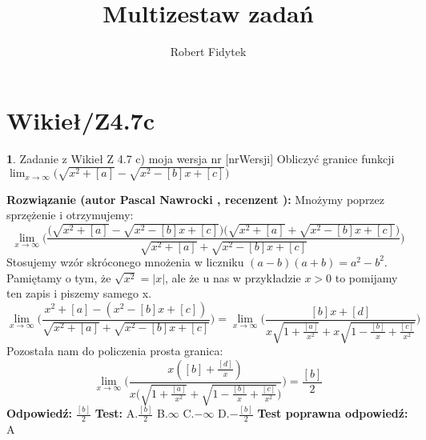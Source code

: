 \documentclass[12pt, a4paper]{article}
\title{Multizestaw zadań}
\author{Robert Fidytek}
\date{}
\theoremstyle{definition} %
\newtheorem{zad}{}
\newcommand{\kategoria}[1]{\section{#1}} %
\newcommand{\zadStart}[1]{\begin{zad}#1\newline} %
\newcommand{\zadStop}{\end{zad}}   %
\newcommand{\rozwStart}[2]{\noindent \textbf{Rozwiązanie (autor #1 , recenzent #2): }\newline} %
\newcommand{\rozwStop}{\newline}                                            %
\newcommand{\odpStart}{\noindent \textbf{Odpowiedź:}\newline}    %
\newcommand{\odpStop}{\newline}                                             %
\newcommand{\testStart}{\noindent \textbf{Test:}\newline} %
\newcommand{\testStop}{\newline} %
\newcommand{\kluczStart}{\noindent \textbf{Test poprawna odpowiedź:}\newline} %
\newcommand{\kluczStop}{\newline} %
\begin{document}
\maketitle


\kategoria{Wikieł/Z4.7c}
\zadStart{Zadanie z Wikieł Z 4.7 c) moja wersja nr [nrWersji]}
Obliczyć granice funkcji $\displaystyle{\lim_{x \to \infty}}\bigg(\sqrt{x^2+[a]}-\sqrt{x^2-[b]x+[c]}\bigg)$
\zadStop
\rozwStart{Pascal Nawrocki}{}
Mnożymy poprzez sprzężenie i otrzymujemy:
$$\displaystyle{\lim_{x \to \infty}}\bigg(\frac{\bigg(\sqrt{x^2+[a]}-\sqrt{x^2-[b]x+[c]}\bigg)\bigg(\sqrt{x^2+[a]}+\sqrt{x^2-[b]x+[c]}\bigg)}{\sqrt{x^2+[a]}+\sqrt{x^2-[b]x+[c]}}\bigg)$$
Stosujemy wzór skróconego mnożenia w liczniku $(a-b)(a+b)=a^2-b^2$. Pamiętamy o tym, że $\sqrt{x^2}=|x|$, ale że u nas w przykładzie $x>0$ to pomijamy ten zapis i piszemy samego x.
$$\displaystyle{\lim_{x \to \infty}}\bigg(\frac{x^2+[a]-(x^2-[b]x+[c])}{\sqrt{x^2+[a]}+\sqrt{x^2-[b]x+[c]}}\bigg)=\displaystyle{\lim_{x \to \infty}}\bigg(\frac{[b]x+[d]}{x\sqrt{1+\frac{[a]}{x^2}}+x\sqrt{1-\frac{[b]}{x}+\frac{[c]}{x^2}}}\bigg)$$
Pozostała nam do policzenia prosta granica:
$$\displaystyle{\lim_{x \to \infty}}\bigg(\frac{x([b]+\frac{[d]}{x})}{x\bigg(\sqrt{1+\frac{[a]}{x^2}}+\sqrt{1-\frac{[b]}{x}+\frac{[c]}{x^2}}\bigg)}\bigg)=\frac{[b]}{2}$$
\rozwStop
\odpStart
$\frac{[b]}{2}$
\odpStop
\testStart
A.$\frac{[b]}{2}$
B.$\infty$
C.$-\infty$
D.$-\frac{[b]}{2}$
\testStop
\kluczStart
A
\kluczStop
\end{document}
